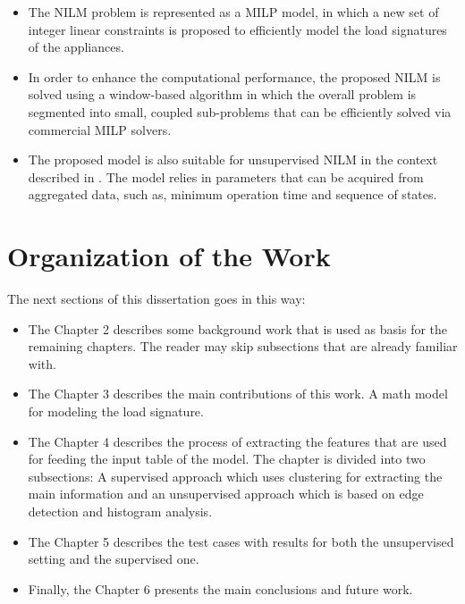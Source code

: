\begin{itemize}
\item The NILM problem is represented as a MILP model, in which a new set of integer linear constraints is proposed to efficiently model the load signatures of the appliances.
\item In order to enhance the computational performance, the proposed NILM is solved using a window-based algorithm in which the overall problem is segmented into small, coupled sub-problems that can be efficiently solved via commercial MILP solvers.
\item The proposed model is also suitable for unsupervised NILM in the context described in \cite{makonin2016}. The model relies in parameters that can be acquired from aggregated data, such as, minimum operation time and sequence of states.
\end{itemize}

\section{Organization of the Work}

The next sections of this dissertation goes in this way:
\begin{itemize}
\item The Chapter 2 describes some background work that is used as basis for the remaining chapters. The reader may skip subsections that are already familiar with. 
\item The Chapter 3 describes the main contributions of this work. A math model for modeling the load signature. 
\item The Chapter 4 describes the process of extracting the features that are used for feeding the input table of the model. The chapter is divided into two subsections: A supervised approach which uses clustering for extracting the main information and an unsupervised approach which is based on edge detection and histogram analysis.
\item The Chapter 5 describes the test cases with results for both the unsupervised setting and the supervised one. 
\item Finally, the Chapter 6 presents the main conclusions and future work. 
\end{itemize}